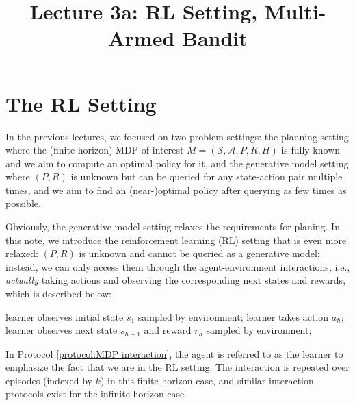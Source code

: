 \newcommand{\Regret}{\operatorname{Regret}}


\title{Lecture 3a: RL Setting, Multi-Armed Bandit}


\section{The RL Setting}
In the previous lectures, we focused on two problem settings:
the planning setting where the (finite-horizon) MDP of interest $M=(\mathcal{S},\mathcal{A}, P, R, H)$ is fully known and we aim to compute an optimal policy for it,
and the generative model setting where $(P,R)$ is unknown but can be queried for any state-action pair multiple times, and we aim to find an (near-)optimal policy after querying as few times as possible.

Obviously, the generative model setting relaxes the requirements for planing. 
In this note, we introduce the reinforcement learning (RL) setting that is even more relaxed:
$(P,R)$ is unknown and cannot be queried as a generative model; instead, we can only access them through the agent-environment interactions, i.e., {\em actually} taking actions and observing the corresponding next states and rewards, which is described below:
\begin{protocol}
\caption{MDP interaction (finite-horizon)} \label{protocol:MDP interaction}
\begin{algorithmic}[1]
    \State learner observes  initial state $s_1$ sampled by environment; 
        \State learner takes action $a_h$;  \label{protocol:MDP interaction:line:RL algorithm}
        \State learner observes next state $s_{h+1}$ and reward $r_h$ sampled by environment;
    \EndFor
\EndFor
\end{algorithmic}
\end{protocol}

In Protocol \ref{protocol:MDP interaction}, the agent is referred to as the learner to emphasize the fact that we are in the RL setting.
The interaction is repeated over episodes (indexed by $k$) in this finite-horizon case, and similar interaction protocols exist for the infinite-horizon case.

